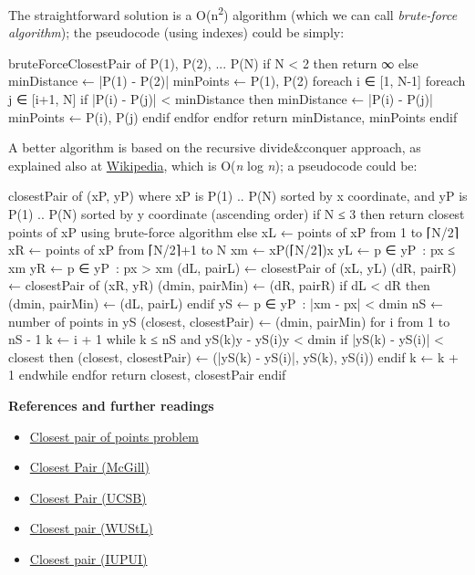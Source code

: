 The straightforward solution is a O(n\textsuperscript{2}) algorithm
(which we can call \emph{brute-force algorithm}); the pseudocode (using
indexes) could be simply:

\begin{wideverbatim}
bruteForceClosestPair of P(1), P(2), ... P(N)
if N < 2 then
  return ∞
else
  minDistance ← |P(1) - P(2)|
  minPoints ← { P(1), P(2) }
  foreach i ∈ [1, N-1]
    foreach j ∈ [i+1, N]
      if |P(i) - P(j)| < minDistance then
        minDistance ← |P(i) - P(j)|
        minPoints ← { P(i), P(j) } 
      endif
    endfor
  endfor
  return minDistance, minPoints
 endif
\end{wideverbatim}

A better algorithm is based on the recursive divide\&conquer approach,
as explained also at
\href{http://en.wikipedia.org/wiki/Closest\_pair\_of\_points\_problem\#Planar\_case}{Wikipedia},
which is O(\emph{n} log \emph{n}); a pseudocode could be:

\begin{wideverbatim}
closestPair of (xP, yP)
               where xP is P(1) .. P(N) sorted by x coordinate, and
                     yP is P(1) .. P(N) sorted by y coordinate (ascending order)
if N ≤ 3 then
  return closest points of xP using brute-force algorithm
else
  xL ← points of xP from 1 to ⌈N/2⌉
  xR ← points of xP from ⌈N/2⌉+1 to N
  xm ← xP(⌈N/2⌉)x
  yL ← { p ∈ yP : px ≤ xm }
  yR ← { p ∈ yP : px > xm }
  (dL, pairL) ← closestPair of (xL, yL)
  (dR, pairR) ← closestPair of (xR, yR)
  (dmin, pairMin) ← (dR, pairR)
  if dL < dR then
    (dmin, pairMin) ← (dL, pairL)
  endif
  yS ← { p ∈ yP : |xm - px| < dmin }
  nS ← number of points in yS
  (closest, closestPair) ← (dmin, pairMin)
  for i from 1 to nS - 1
    k ← i + 1
    while k ≤ nS and yS(k)y - yS(i)y < dmin
      if |yS(k) - yS(i)| < closest then
        (closest, closestPair) ← (|yS(k) - yS(i)|, {yS(k), yS(i)})
      endif
      k ← k + 1
    endwhile
  endfor
  return closest, closestPair
endif
\end{wideverbatim}

\textbf{References and further readings}

\begin{itemize}
\item
  \href{http://en.wikipedia.org/wiki/Closest\_pair\_of\_points\_problem}{Closest
  pair of points problem}
\item
  \href{http://www.cs.mcgill.ca/~cs251/ClosestPair/ClosestPairDQ.html}{Closest
  Pair (McGill)}
\item
  \href{http://www.cs.ucsb.edu/~suri/cs235/ClosestPair.pdf}{Closest Pair
  (UCSB)}
\item
  \href{http://classes.cec.wustl.edu/~cse241/handouts/closestpair.pdf}{Closest
  pair (WUStL)}
\item
  \href{http://www.cs.iupui.edu/~xkzou/teaching/CS580/Divide-and-conquer-closestPair.ppt}{Closest
  pair (IUPUI)}
\end{itemize}


